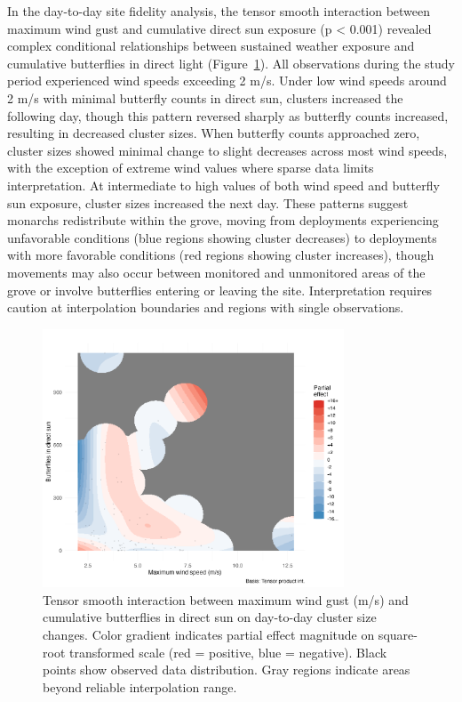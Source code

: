 In the day-to-day site fidelity analysis, the tensor smooth interaction between maximum wind gust and cumulative direct sun exposure (p < 0.001) revealed complex conditional relationships between sustained weather exposure and cumulative butterflies in direct light (Figure~\ref{fig:interaction_wind_sun_sunset}). All observations during the study period experienced wind speeds exceeding 2 m/s. Under low wind speeds around 2 m/s with minimal butterfly counts in direct sun, clusters increased the following day, though this pattern reversed sharply as butterfly counts increased, resulting in decreased cluster sizes. When butterfly counts approached zero, cluster sizes showed minimal change to slight decreases across most wind speeds, with the exception of extreme wind values where sparse data limits interpretation. At intermediate to high values of both wind speed and butterfly sun exposure, cluster sizes increased the next day. These patterns suggest monarchs redistribute within the grove, moving from deployments experiencing unfavorable conditions (blue regions showing cluster decreases) to deployments with more favorable conditions (red regions showing cluster increases), though movements may also occur between monitored and unmonitored areas of the grove or involve butterflies entering or leaving the site. Interpretation requires caution at interpolation boundaries and regions with single observations. 

\begin{figure}[htbp]
    \centering
    \includegraphics[width=0.8\textwidth]{supplemental/results/sunset/figures/interaction_wind_x_sun_binned.png}
    \caption[Wind × sunlight interaction (day-to-day analysis)]{Tensor smooth interaction between maximum wind gust (m/s) and cumulative butterflies in direct sun on day-to-day cluster size changes. Color gradient indicates partial effect magnitude on square-root transformed scale (red = positive, blue = negative). Black points show observed data distribution. Gray regions indicate areas beyond reliable interpolation range.}
    \label{fig:interaction_wind_sun_sunset}
\end{figure}

